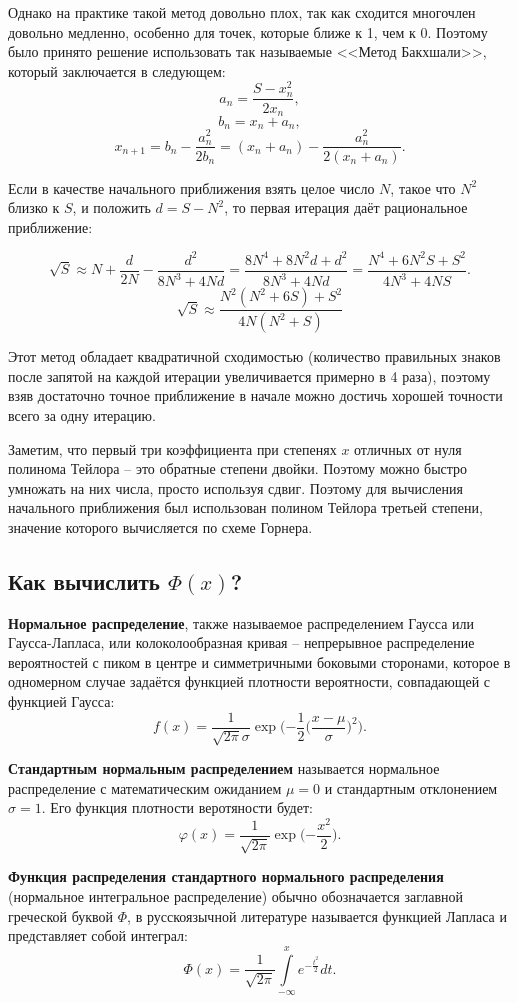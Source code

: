 \documentclass{article}
\begin{document}
Однако на практике такой метод довольно плох, так как сходится многочлен довольно медленно, особенно для точек, которые ближе к 1, чем к 0. Поэтому было принято решение использовать так называемые <<Метод Бакхшали>>, который заключается в следующем:
\[
a_n = \frac{S - x_n^2}{2x_n},
\]
\[
b_n = x_n + a_n,
\]
\[
x_{n+1} = b_n - \frac{a_n^2}{2b_n} 
= (x_n + a_n) - \frac{a_n^2}{2(x_n + a_n)}.
\]

Если в качестве начального приближения взять целое число \(N\), такое что \(N^2\) близко к \(S\), и положить \(d = S - N^2\), то первая итерация даёт рациональное приближение:

\[
\sqrt{S} \approx N + \frac{d}{2N} - \frac{d^2}{8N^3 + 4Nd}
= \frac{8N^4 + 8N^2d + d^2}{8N^3 + 4Nd}
= \frac{N^4 + 6N^2S + S^2}{4N^3 + 4NS}.
\]
\[
\sqrt{S} \approx 
\frac{N^2(N^2 + 6S) + S^2}{4N(N^2 + S)}
\]

Этот метод обладает квадратичной сходимостью (количество правильных знаков после запятой на каждой итерации увеличивается примерно в 4 раза), поэтому взяв достаточно точное приближение в начале можно достичь хорошей точности всего за одну итерацию.

Заметим, что первый три коэффициента при степенях $x$ отличных от нуля полинома Тейлора -- это обратные степени двойки. Поэтому можно быстро умножать на них числа, просто используя сдвиг. Поэтому для вычисления начального приближения был использован полином Тейлора третьей степени, значение которого вычисляется по схеме Горнера.
\subsection{Как вычислить $\Phi(x)$?}
\textbf{Нормальное распределение}, также называемое распределением Гаусса или Гаусса-Лапласа, или колоколообразная кривая -- непрерывное распределение вероятностей с пиком в центре и симметричными боковыми сторонами, которое в одномерном случае задаётся функцией плотности вероятности, совпадающей с функцией Гаусса:
\[
f(x) = \frac{1}{\sqrt{2\pi}\sigma}\operatorname{exp}\bigg({-\frac{1}{2}\Big(\frac{x-\mu}{\sigma}\Big)^2}\bigg).
\]

\textbf{Стандартным нормальным распределением} называется нормальное распределение с математическим ожиданием $\mu = 0$ и стандартным отклонением $\sigma = 1$. Его функция плотности веротяности будет:
\[
\varphi(x) = \frac{1}{\sqrt{2\pi}}\operatorname{exp}\bigg({-\frac{x^2}{2}}\bigg).
\]

\textbf{Функция распределения стандартного нормального распределения} (нормальное интегральное распределение) обычно обозначается заглавной греческой буквой $\Phi$, в русскоязычной литературе называется функцией Лапласа и представляет собой интеграл:
\[
\Phi(x) = \frac{1}{\sqrt{2\pi}}\int\limits_{-\infty}^{x}e^{-\frac{t^2}{2}}dt.
\]
\end{document}
